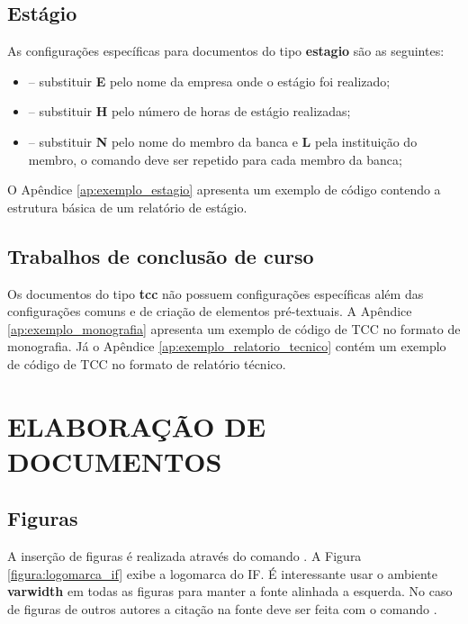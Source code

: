 \documentclass[artigo]{iftex2024}
\begin{document}
\subsection{Estágio}

As configurações específicas para documentos do tipo \textbf{estagio} são as seguintes:
\begin{itemize}
  \item[] \comando{empresa\{E\}]} -- substituir \textbf{E} pelo nome da empresa onde o estágio foi realizado;

  \item[] \comando{horas\{H\}]} -- substituir \textbf{H} pelo número de horas de estágio realizadas;

  \item[]  -- substituir \textbf{N} pelo nome do membro da banca e \textbf{L} pela instituição do membro, o comando deve ser repetido para cada membro da banca;
\end{itemize}

O Apêndice \ref{ap:exemplo_estagio} apresenta um exemplo de código contendo a estrutura básica de um relatório de estágio.

\subsection{Trabalhos de conclusão de curso} \label{sec:conf_tcc}

Os documentos do tipo \textbf{tcc} não possuem configurações específicas além das configurações comuns e de criação de elementos pré-textuais.
A Apêndice \ref{ap:exemplo_monografia} apresenta um exemplo de código de TCC no formato de monografia.
Já o Apêndice \ref{ap:exemplo_relatorio_tecnico} contém um exemplo de código de TCC no formato de relatório técnico.

\section{ELABORAÇÃO DE DOCUMENTOS}

\subsection{Figuras}

A inserção de figuras é realizada através do comando .
A Figura \ref{figura:logomarca_if} exibe a logomarca do IF.
É interessante usar o ambiente \textbf{varwidth} em todas as figuras para manter a fonte alinhada a esquerda.
No caso de figuras de outros autores a citação na fonte deve ser feita com o comando .
\end{document}
